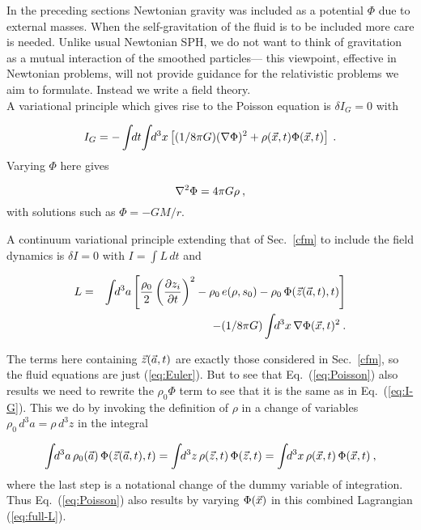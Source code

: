 In the preceding sections Newtonian gravity was included as a potential $\Phi$
due to external masses.  When the self-gravitation of the fluid is to be
included more care is needed.  Unlike usual Newtonian SPH, we do not want to
think of gravitation as a mutual interaction of the smoothed particles---
this viewpoint, effective in Newtonian problems, will not provide guidance
for the relativistic problems we aim to formulate.  Instead we write a
field theory.\\

A variational principle which gives rise to the Poisson equation is
$\delta I_G = 0$ with

\begin{equation}\label{eq:I-G}
    I_G = -\int\!\!dt\!\int\!\!d^3x \left[
            (1/8\pi G)(\nabla \Phi)^2 + \rho({\vec x},t) \Phi({\vec x},t) \right] \: .
\end{equation}
%
Varying $\Phi$ here gives

\begin{equation}\label{eq:Poisson}
    \nabla^2 \Phi = 4 \pi G \rho  \: ,
\end{equation}
%
with solutions such as $\Phi = -GM/r$.

A continuum variational principle extending that of Sec.~\ref{cfm} to include
the field dynamics is $\delta I = 0$ with $I = \int\!L\,dt$ and

\begin{eqnarray}\label{eq:full-L}
    L & = & \int\!\! d^3a \left[\frac{\rho_0}{2} \left(
        \frac{\partial z_i}{\partial t}\right)^2
      - \rho_0\, e(\rho,s_0) - \rho_0\, \Phi({\vec z}({\vec a},t),t) \right]
       \nonumber \\
      & & - (1/8\pi G)\int\!\!d^3x\,\nabla \Phi({\vec x},t)^2  \: .
\end{eqnarray}

The terms here containing ${\vec z}({\vec a},t)$ are exactly those considered in
Sec.~\ref{cfm}, so the fluid equations are just (\ref{eq:Euler}).  But to see
that Eq.~(\ref{eq:Poisson}) also results we need to rewrite the $\rho_0\Phi$
term to see that it is the same as in Eq.~(\ref{eq:I-G}).  This we do by
invoking the definition of $\rho$ in a change of variables $\rho_0\,d^3a
= \rho\,d^3z$ in the integral

\begin{equation}\label{eq:rhoPhi}
    \int\!\! d^3a\, \rho_0({\vec a})\, \Phi({\vec z}({\vec a},t),t) =
    \int\!\! d^3z\, \rho({\vec z},t)\, \Phi({\vec z},t) =
    \int\!\! d^3x\, \rho({\vec x},t)\, \Phi({\vec x},t) \: ,
\end{equation}
%
where the last step is a notational change of the dummy variable
of integration.  Thus Eq.~(\ref{eq:Poisson}) also results by varying
$\Phi({\vec x})$ in this combined Lagrangian (\ref{eq:full-L}).

